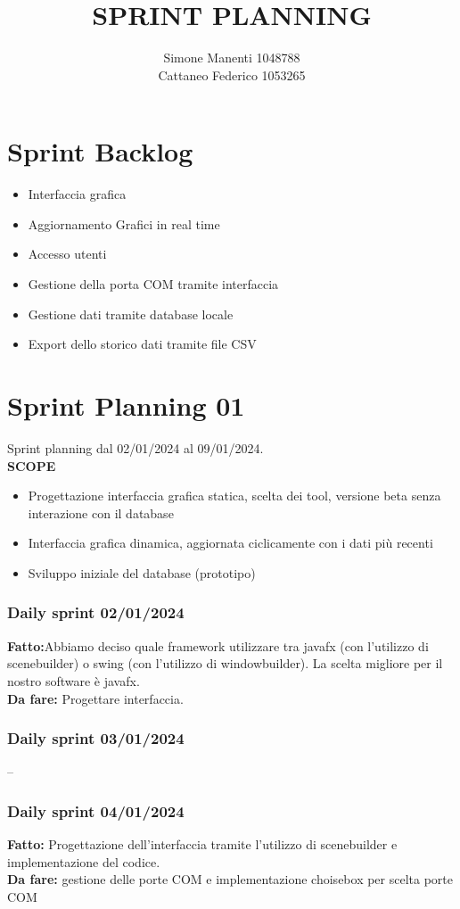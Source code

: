 \documentclass{report}
\title{SPRINT PLANNING}
\author{Simone Manenti 1048788 \\ Cattaneo Federico 1053265}
\begin{document}
\maketitle
\chapter{Sprint Backlog}
\begin{itemize}
\item Interfaccia grafica
\item Aggiornamento Grafici in real time
\item Accesso utenti
\item Gestione della porta COM tramite interfaccia
\item Gestione dati tramite database locale
\item Export dello storico dati tramite file CSV
\end{itemize}

\chapter{Sprint Planning 01}
Sprint planning dal 02/01/2024 al 09/01/2024.\\

\textbf{SCOPE}
\begin{itemize}
\item Progettazione interfaccia grafica statica, scelta dei tool, versione beta senza interazione con il database
\item Interfaccia grafica dinamica, aggiornata ciclicamente con i dati più recenti
\item Sviluppo iniziale del database (prototipo)
\end{itemize}


\subsection{Daily sprint 02/01/2024}
\textbf{Fatto:}Abbiamo deciso quale framework utilizzare tra javafx (con l'utilizzo di scenebuilder) o swing (con l'utilizzo di windowbuilder). La scelta migliore per il nostro software è javafx.\\
\textbf{Da fare:} Progettare interfaccia.
\subsection{Daily sprint 03/01/2024}
--
\subsection{Daily sprint 04/01/2024}
\textbf{Fatto:} Progettazione dell'interfaccia tramite l'utilizzo di scenebuilder e implementazione del codice.\\
\textbf{Da fare:} gestione delle porte COM e implementazione choisebox per scelta porte COM
\end{document}
